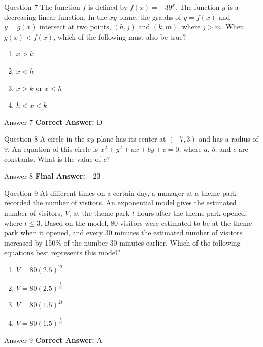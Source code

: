 \documentclass{beamer}
\begin{document}
\begin{frame}{Question 7}
\small
The function $f$ is defined by $f(x) = -39^x$. The function $g$ is a decreasing linear function.  
In the $xy$-plane, the graphs of $y = f(x)$ and $y = g(x)$ intersect at two points, $(h, j)$ and $(k, m)$, where $j > m$.  
When $g(x) < f(x)$, which of the following must also be true?
\vspace{0.35cm}
\begin{enumerate}
    \item[A.] $x > k$
    \item[B.] $x < h$
    \item[C.] $x > k$ or $x < h$
    \item[D.] $h < x < k$
\end{enumerate}
\end{frame}
\begin{frame}{Answer 7}
\small
\textbf{Correct Answer:} D
\end{frame}

\begin{frame}{Question 8}
\small
A circle in the $xy$-plane has its center at $(-7, 3)$ and has a radius of $9$.  
An equation of this circle is $x^2 + y^2 + ax + by + c = 0$, where $a$, $b$, and $c$ are constants.  
What is the value of $c$?
\end{frame}
\begin{frame}{Answer 8}
\small
\textbf{Final Answer:} $\boxed{-23}$
\end{frame}

\begin{frame}{Question 9}
\small
At different times on a certain day, a manager at a theme park recorded the number of visitors.  
An exponential model gives the estimated number of visitors, $V$, at the theme park $t$ hours after the theme park opened, where $t \leq 3$.  
Based on the model, 80 visitors were estimated to be at the theme park when it opened,  
and every 30 minutes the estimated number of visitors increased by 150\% of the number 30 minutes earlier.  
Which of the following equations best represents this model?
\vspace{0.35cm}
\begin{enumerate}
    \item[A.] $V = 80(2.5)^{2t}$
    \item[B.] $V = 80(2.5)^{\frac{t}{30}}$
    \item[C.] $V = 80(1.5)^{2t}$
    \item[D.] $V = 80(1.5)^{\frac{t}{30}}$
\end{enumerate}
\end{frame}
\begin{frame}{Answer 9}
\small
\textbf{Correct Answer:} A
\end{frame}
\end{document}
